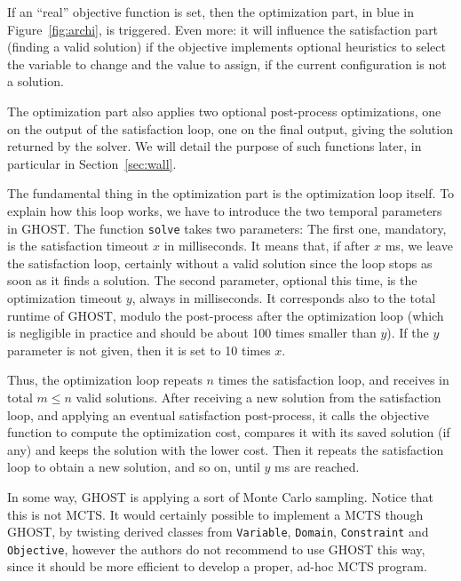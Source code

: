 \documentclass[journal]{IEEEtran}
\newcommand{\ghost}{\textsc{GHOST}\xspace}
\begin{document}
If an ``real'' objective function  is set, then the optimization part,
in blue  in Figure~\ref{fig:archi}, is  triggered. Even more:  it will
influence  the satisfaction  part (finding  a valid  solution) if  the
objective  implements optional  heuristics to  select the  variable to
change and the value to assign,  if the current configuration is not a
solution.

The  optimization   part  also   applies  two   optional  post-process
optimizations, one on the output of  the satisfaction loop, one on the
final output,  giving the  solution returned by  the solver.   We will
detail  the  purpose  of  such   functions  later,  in  particular  in
Section~\ref{sec:wall}.

The fundamental  thing in  the optimization  part is  the optimization
loop itself. To explain how this  loop works, we have to introduce the
two temporal  parameters in \ghost. The  function \texttt{solve} takes
two parameters: The first one,  mandatory, is the satisfaction timeout
$x$ in  milliseconds.  It means  that, if after  $x$ ms, we  leave the
satisfaction loop, certainly  without a valid solution  since the loop
stops as soon  as it finds a solution. The  second parameter, optional
this time, is the optimization timeout $y$, always in milliseconds. It
corresponds  also  to   the  total  runtime  of   \ghost,  modulo  the
post-process  after  the optimization  loop  (which  is negligible  in
practice and should  be about 100 times smaller than  $y$). If the $y$
parameter is not given, then it is set to 10 times $x$.

Thus, the optimization  loop repeats $n$ times  the satisfaction loop,
and receives  in total $m \leq  n$ valid solutions. After  receiving a
new  solution from  the satisfaction  loop, and  applying an  eventual
satisfaction post-process, it calls  the objective function to compute
the optimization  cost, compares it  with its saved solution  (if any)
and  keeps the  solution with  the lower  cost.  Then  it repeats  the
satisfaction loop  to obtain a new  solution, and so on,  until $y$ ms
are reached.

In some way, \ghost is applying a sort of Monte Carlo sampling. Notice
that this  is not MCTS.   It would  certainly possible to  implement a
MCTS    though   \ghost,    by   twisting    derived   classes    from
\texttt{Variable},     \texttt{Domain},    \texttt{Constraint}     and
\texttt{Objective}, however the authors do not recommend to use \ghost
this  way, since  it should  be more  efficient to  develop a  proper,
ad-hoc MCTS program.
\end{document}
